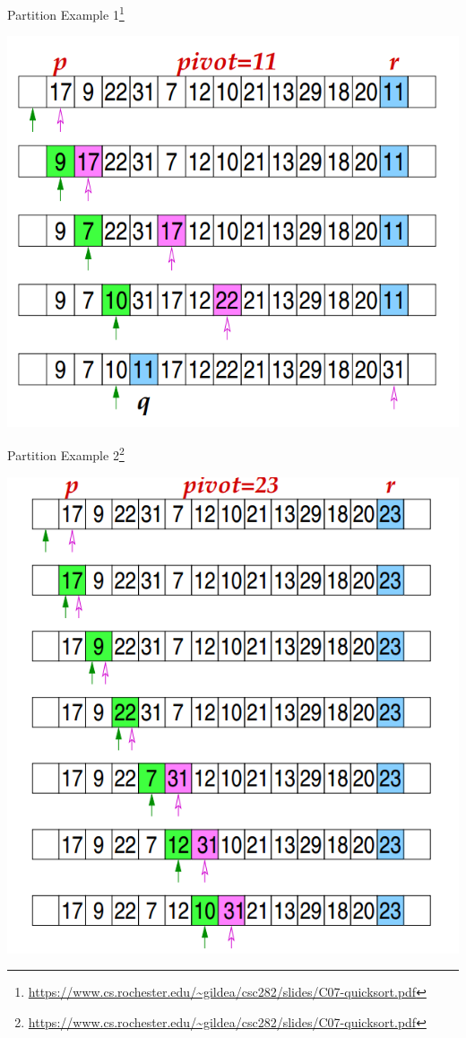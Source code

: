 \documentclass{beamer}
\begin{document}
\begin{frame}{Partition Example 1\footnote{\url{https://www.cs.rochester.edu/~gildea/csc282/slides/C07-quicksort.pdf}}}
\begin{center}
    \includegraphics[scale=0.34]{partitionExample1.png}
\end{center}
\end{frame}


\begin{frame}{Partition Example 2\footnote{\url{https://www.cs.rochester.edu/~gildea/csc282/slides/C07-quicksort.pdf}}}
\begin{center}
    \includegraphics[scale=0.3]{partitionExample2.png}
\end{center}
\end{frame}
\end{document}
